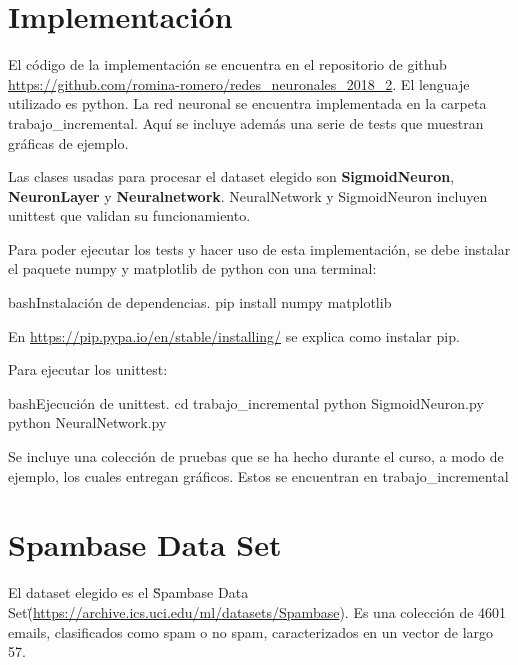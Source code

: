 \documentclass[letterpaper,11pt]{article} %
\begin{document}








\section{Implementación}

El código de la implementación se encuentra en el repositorio de github \url{https://github.com/romina-romero/redes_neuronales_2018_2}. El lenguaje utilizado es python. La red neuronal se encuentra implementada en la carpeta trabajo\_incremental. Aquí se incluye además una serie de tests que muestran gráficas de ejemplo. 

Las clases usadas para procesar el dataset elegido son \textbf{SigmoidNeuron}, \textbf{NeuronLayer} y \textbf{Neuralnetwork}. NeuralNetwork y SigmoidNeuron incluyen unittest que validan su funcionamiento. 

Para poder ejecutar los tests y hacer uso de esta implementación, se debe instalar el paquete numpy y matplotlib de python con una terminal:
\begin{sourcecode}[\label{instalacion}]{bash}{Instalación de dependencias.}
pip install numpy matplotlib
\end{sourcecode}

En \url{https://pip.pypa.io/en/stable/installing/} se explica como instalar pip.

Para ejecutar los unittest:
\begin{sourcecode}[\label{instalacion}]{bash}{Ejecución de unittest.}
cd trabajo_incremental
python SigmoidNeuron.py
python NeuralNetwork.py
\end{sourcecode}

Se incluye una colección de pruebas que se ha hecho durante el curso, a modo de ejemplo, los cuales entregan gráficos. Estos se encuentran en trabajo_incremental
\section{Spambase Data Set}
El dataset elegido es el \"Spambase Data Set\" (\url{https://archive.ics.uci.edu/ml/datasets/Spambase}). Es una colección de 4601 emails, clasificados como spam o no spam, caracterizados en un vector de largo 57. \\
\end{document}
